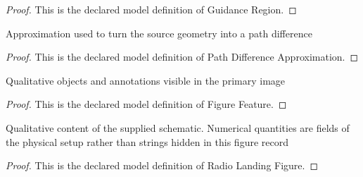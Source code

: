 \begin{proof}
  This is the declared model definition of Guidance Region.
\end{proof}
\begin{definition}
  \label{def:physics:phyx-mini-0247:phyxminiproblems-problemphyxmini0247-pathdifferenceapproximation}
  Approximation used to turn the source geometry into a path difference
\end{definition}
\begin{proof}
  This is the declared model definition of Path Difference Approximation.
\end{proof}
\begin{definition}
  \label{def:physics:phyx-mini-0247:phyxminiproblems-problemphyxmini0247-figurefeature}
  Qualitative objects and annotations visible in the primary image
\end{definition}
\begin{proof}
  This is the declared model definition of Figure Feature.
\end{proof}
\begin{definition}
  \label{def:physics:phyx-mini-0247:phyxminiproblems-problemphyxmini0247-radiolandingfigure}
  Qualitative content of the supplied schematic. Numerical quantities are fields of the physical setup rather than strings hidden in this figure record
\end{definition}
\begin{proof}
  This is the declared model definition of Radio Landing Figure.
\end{proof}
